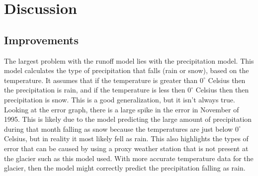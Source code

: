 \documentclass{article}
\begin{document}

\section{Discussion}

\subsection{Improvements}
The largest problem with the runoff model lies with the precipitation model. This model calculates the type of precipitation that falls (rain or 
snow), based on the temperature. It assumes that if the temperature is greater than $0^\circ$ Celsius then the precipitation is rain, and if the 
temperature is less then $0^\circ$ Celsius then then precipitation is snow. This is a good generalization, but it isn't always true. Looking at the 
error graph, there is a large spike in the error in November of 1995. This is likely due to the model predicting the large amount of precipitation 
during that month falling as snow because the temperatures are just below $0^\circ$ Celsius, but in reality it most likely fell as rain. This also 
highlights the types of error that can be caused by using a proxy weather station that is not present at the glacier such as this model used. With 
more accurate temperature data for the glacier, then the model might correctly predict the precipitation falling as rain. 
\end{document}
